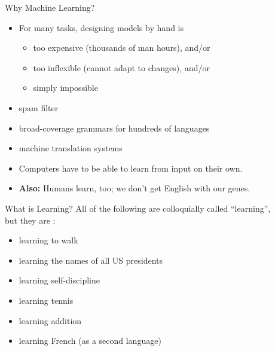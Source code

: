 \documentclass[xcolor={usenames,svgnames,x11names,dvipsnames,table}]{beamer}
\begin{document}
\begin{frame}{Why Machine Learning?}
    \begin{itemize}
        \item For many tasks, designing models by hand is
            \begin{itemize}
                \item too expensive (thousands of man hours), and\slash or
                \item too inflexible (cannot adapt to changes), and\slash or
                \item simply impossible
            \end{itemize}
    \end{itemize}

    \begin{example}
        \begin{itemize}
            \item spam filter
            \item broad-coverage grammars for hundreds of languages
            \item machine translation systems
        \end{itemize}
    \end{example}

    \begin{itemize}
        \item Computers have to be able to learn from input on their own.
        \item \textbf{Also:} Humans learn, too; we don't get English with our genes.
    \end{itemize}
\end{frame}

\begin{frame}{What is Learning?}
    All of the following are colloquially called ``learning'',\\
    but they are :
    \begin{itemize}
        \item learning to walk
        \item learning the names of all US presidents
        \item learning self-discipline
        \item learning tennis
        \item learning addition
        \item learning French (as a second language)
    \end{itemize}
\end{frame}
\end{document}
